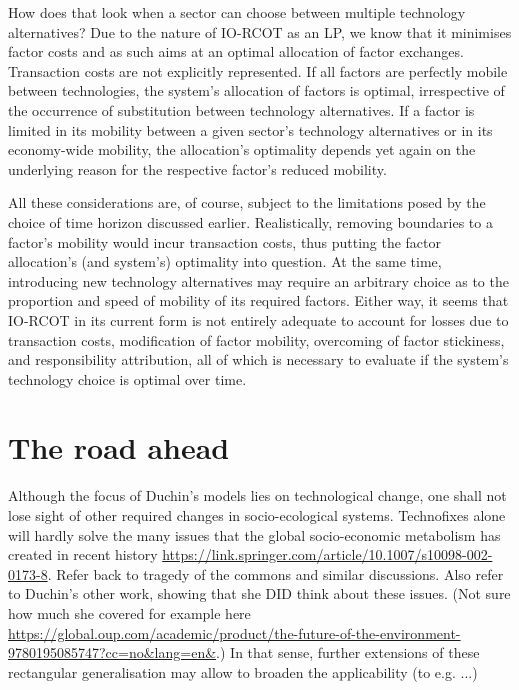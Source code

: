 \documentclass{article}
\begin{document}
\begin{refsection}
How does that look when a sector can choose between multiple technology alternatives? Due to the nature of IO-RCOT as an LP, we know that it minimises factor costs and as such aims at an optimal allocation of factor exchanges. Transaction costs are not explicitly represented. If all factors are perfectly mobile between technologies, the system's allocation of factors is optimal, irrespective of the occurrence of substitution between technology alternatives. If a factor is limited in its mobility between a given sector's technology alternatives or in its economy-wide mobility, the allocation's optimality depends yet again on the underlying reason for the respective factor's reduced mobility.

All these considerations are, of course, subject to the limitations posed by the choice of time horizon discussed earlier. Realistically, removing boundaries to a factor's mobility would incur transaction costs, thus putting the factor allocation's (and system's) optimality into question. At the same time, introducing new technology alternatives may require an arbitrary choice as to the proportion and speed of mobility of its required factors. Either way, it seems that IO-RCOT in its current form is not entirely adequate to account for losses due to transaction costs, modification of factor mobility, overcoming of factor stickiness, and responsibility attribution, all of which is necessary to evaluate if the system's technology choice is optimal over time.

\section{The road ahead}

Although the focus of Duchin's models lies on technological change, one shall not lose sight of other required changes in socio-ecological systems. Technofixes alone will hardly solve the many issues that the global socio-economic metabolism has created in recent history \url{https://link.springer.com/article/10.1007/s10098-002-0173-8}. Refer back to tragedy of the commons and similar discussions. Also refer to Duchin's other work, showing that she DID think about these issues. (Not sure how much she covered for example here \url{https://global.oup.com/academic/product/the-future-of-the-environment-9780195085747?cc=no&lang=en&}.) In that sense, further extensions of these rectangular generalisation may allow to broaden the applicability (to e.g. ...)


\newrefcontext[sorting=nyt] %
\printbibliography[heading = bibintoc] %

\end{refsection}
\end{document}

